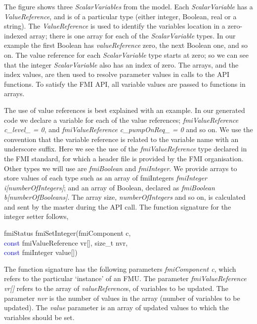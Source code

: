 \documentclass{llncs}%
\begin{document}
The figure shows three \emph{ScalarVariables} from the model. Each \emph{ScalarVariable} has a \emph{ValueReference}, and is of a particular type (either integer, Boolean, real or a string). The \emph{ValueReference} is used to identify the variables location in a zero-indexed array; there is one array for each of the \emph{ScalarVariable} types. In our example the first Boolean has \emph{valueReference} zero, the next Boolean one, and so on. The value reference for each \emph{ScalarVariable} type starts at zero; so we can see that the integer \emph{ScalarVariable} also has an index of zero. The arrays, and the index values, are then used to resolve parameter values in calls to the API functions. To satisfy the FMI API, all variable values are passed to functions in arrays. 

The use of value references is best explained with an example. In our generated code we declare a variable for each of the value references; \emph{fmiValueReference c\_level\_ = 0}, and \emph{fmiValueReference c\_pumpOnReq\_ = 0} and so on. We use the convention that the variable reference is related to the variable name with an underscore suffix. Here we see the use of the \emph{fmiValueReference} type declared in the FMI standard, for which a header file is provided by the FMI organisation. Other types we will use are \emph{fmiBoolean} and \emph{fmiInteger}. We provide arrays to store values of each type such as an array of fmiIntegers \emph{fmiInteger i[numberOfIntegers]}; and an array of Boolean, declared as \emph{fmiBoolean b[numberOfBooleans]}.  The array size, \emph{numberOfIntegers} and so on, is calculated and sent by the master during the API call. The function signature for the integer setter follows,
%
\begin{center}
\begin{minipage}{0.8\textwidth}
fmiStatus fmiSetInteger(fmiComponent c,\\
\hspace*{3.5cm}\textcolor{blue}{const} fmiValueReference vr[], size\_t nvr,\\
\hspace*{3.5cm}\textcolor{blue}{const} fmiInteger value[])
\end{minipage}
\end{center}
%
\noindent The function signature has the following parameters \emph{fmiComponent c}, which refers to the particular `instance' of an FMU. The parameter \emph{fmiValueReference vr[]} refers to the array of \emph{valueReference}s, of variables to be updated. The parameter \emph{nvr} is the number of values in the array (number of variables to be updated). The \emph{value} parameter is an array of updated values to which the variables should be set.
\end{document}
